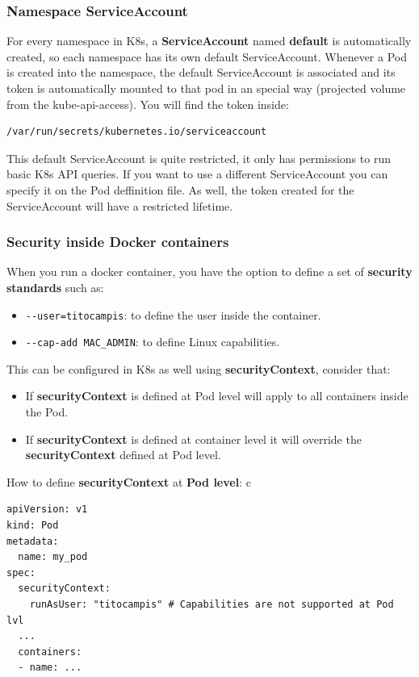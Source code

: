 \documentclass{article}
\newenvironment{codetemplate}[1][]{%
  \mybasecolorbox[#1]
  \itshape
}{%
  \endmybasecolorbox
}
\begin{document}
\subsubsection{Namespace ServiceAccount}
For every namespace in K8s, a \textbf{ServiceAccount} named \textbf{default} is automatically created, so each namespace has its own default ServiceAccount.
Whenever a Pod is created into the namespace, the default ServiceAccount is associated and its token is automatically mounted to that pod in an special way (projected volume from the kube-api-access). You will find the token inside:
\begin{codetemplate}{}
\begin{verbatim}
/var/run/secrets/kubernetes.io/serviceaccount
\end{verbatim}
\end{codetemplate}

This default ServiceAccount is quite restricted, it only has permissions to run basic K8s API queries.
If you want to use a different ServiceAccount you can specify it on the Pod deffinition file. As well, the token created
for the ServiceAccount will have a restricted lifetime.

\subsubsection{Security inside Docker containers}
When you run a docker container, you have the option to define a set of \textbf{security standards} such as:
\begin{itemize}
    \item \verb|--user=titocampis|: to define the user inside the container.
    \item \verb|--cap-add MAC_ADMIN|: to define Linux capabilities.
\end{itemize}

This can be configured in K8s as well using \textbf{securityContext}, consider that:
\begin{itemize}
    \item If \textbf{securityContext} is defined at Pod level will apply to all containers inside the Pod.
    \item If \textbf{securityContext} is defined at container level it will override the \textbf{securityContext} defined at Pod level.
\end{itemize}

How to define \textbf{securityContext} at \textbf{Pod level}:
c\begin{codetemplate}{}
\begin{verbatim}
apiVersion: v1
kind: Pod
metadata:
  name: my_pod
spec:
  securityContext:
    runAsUser: "titocampis" # Capabilities are not supported at Pod lvl
  ...
  containers:
  - name: ...
\end{verbatim}
\end{codetemplate}
\end{document}
